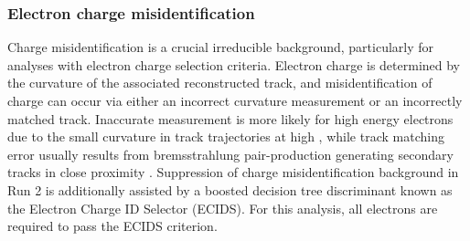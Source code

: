 \documentclass[../thesis.tex]{subfiles}
\begin{document}
\subsubsection*{Electron charge misidentification}
Charge misidentification is a crucial irreducible background, particularly for analyses with electron charge selection criteria. Electron charge is determined by the curvature of the associated reconstructed track, and misidentification of charge can occur via either an incorrect curvature measurement or an incorrectly matched track. Inaccurate measurement is more likely for high energy electrons due to the small curvature in track trajectories at high \pT, while track matching error usually results from bremsstrahlung pair-production generating secondary tracks in close proximity \citep{reco:electron_id}. Suppression of charge misidentification background in Run 2 is additionally assisted by a boosted decision tree discriminant known as the Electron Charge ID Selector (\acs{ECIDS}). For this analysis, all electrons are required to pass the \acs{ECIDS} criterion.
\end{document}
